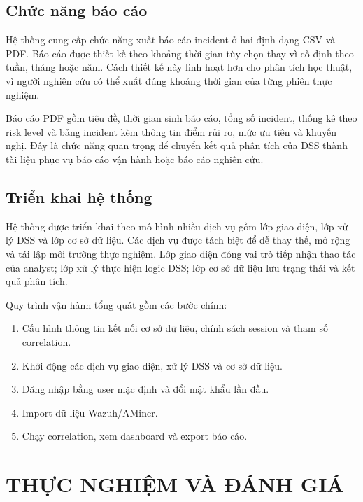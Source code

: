 \documentclass[a4paper,12pt,oneside]{book}
\begin{document}
\section{Chức năng báo cáo}
{\fontsize{13pt}{15.6pt}\selectfont

Hệ thống cung cấp chức năng xuất báo cáo incident ở hai định dạng CSV và PDF. Báo cáo được thiết kế theo khoảng thời gian tùy chọn thay vì cố định theo tuần, tháng hoặc năm. Cách thiết kế này linh hoạt hơn cho phân tích học thuật, vì người nghiên cứu có thể xuất đúng khoảng thời gian của từng phiên thực nghiệm.

\noindent Báo cáo PDF gồm tiêu đề, thời gian sinh báo cáo, tổng số incident, thống kê theo risk level và bảng incident kèm thông tin điểm rủi ro, mức ưu tiên và khuyến nghị. Đây là chức năng quan trọng để chuyển kết quả phân tích của DSS thành tài liệu phục vụ báo cáo vận hành hoặc báo cáo nghiên cứu.

}

\section{Triển khai hệ thống}
{\fontsize{13pt}{15.6pt}\selectfont

Hệ thống được triển khai theo mô hình nhiều dịch vụ gồm lớp giao diện, lớp xử lý DSS và lớp cơ sở dữ liệu. Các dịch vụ được tách biệt để dễ thay thế, mở rộng và tái lập môi trường thực nghiệm. Lớp giao diện đóng vai trò tiếp nhận thao tác của analyst; lớp xử lý thực hiện logic DSS; lớp cơ sở dữ liệu lưu trạng thái và kết quả phân tích.

\noindent Quy trình vận hành tổng quát gồm các bước chính:

\begin{enumerate}
    \item Cấu hình thông tin kết nối cơ sở dữ liệu, chính sách session và tham số correlation.
    \item Khởi động các dịch vụ giao diện, xử lý DSS và cơ sở dữ liệu.
    \item Đăng nhập bằng user mặc định và đổi mật khẩu lần đầu.
    \item Import dữ liệu Wazuh/AMiner.
    \item Chạy correlation, xem dashboard và export báo cáo.
\end{enumerate}

}

\chapter{\MakeTextUppercase{Thực nghiệm và đánh giá}}
\end{document}
